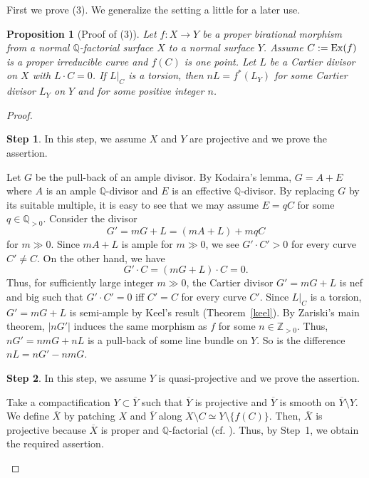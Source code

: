 \documentclass[12pt,twoside]{amsart}
\newtheorem{prop}[thm]{Proposition}
\theoremstyle{definition}
\newtheorem{step}{Step}
\newcommand{\Q}{$\mathbb{Q}$}
\begin{document}
First we prove (3). 
We generalize the setting a little for a later use. 

\begin{prop}[Proof of (3)]\label{(3)}
Let $f:X \to Y$ be a proper birational morphism 
from a normal \Q-factorial surface $X$ 
to a normal surface $Y$. 
Assume $C:={\rm Ex}(f)$ is a proper irreducible curve and $f(C)$ is one point. 
Let $L$ be a Cartier divisor on $X$ with $L\cdot C=0$. 
If $L|_C$ is a torsion, then $nL=f^*(L_Y)$ 
for some Cartier divisor $L_Y$ on $Y$ and for some positive integer $n$.
\end{prop}

\begin{proof}
\setcounter{step}{0}
\begin{step}
In this step, we assume $X$ and $Y$ are projective and 
we prove the assertion. 

Let $G$ be the pull-back of an ample divisor. 
By Kodaira's lemma, $G=A+E$ where $A$ is an ample \Q-divisor and 
$E$ is an effective \Q-divisor. 
By replacing $G$ by its suitable multiple, 
it is easy to see that we may assume $E=qC$ for some $q\in \mathbb Q_{>0}.$ 
Consider the divisor 
$$G'=mG+L=(mA+L)+mqC$$ 
for $m \gg 0.$ 
Since $mA+L$ is ample for $m\gg 0$, 
we see $G'\cdot C'>0$ for every curve $C'\neq C.$ 
On the other hand, we have 
$$G'\cdot C=(mG+L)\cdot C=0.$$
Thus, for sufficiently large integer $m\gg 0$, 
the Cartier divisor $G'=mG+L$ is nef and big such that 
$G'\cdot C'=0$ iff $C'=C$ for every curve $C'$. 
Since $L|_C$ is a torsion, 
$G'=mG+L$ is semi-ample by Keel's result (Theorem~\ref{keel}). 
By Zariski's main theorem, $|nG'|$ induces the 
same morphism as $f$ for some $n\in\mathbb Z_{>0}$. 
Thus, $nG'=nmG+nL$ is a pull-back of some line bundle on $Y$. 
So is the difference $nL=nG'-nmG$. 
\end{step}

\begin{step}
In this step, we assume $Y$ is quasi-projective and 
we prove the assertion. 

Take a compactification $Y\subset \overline Y$ such that 
$\overline Y$ is projective and $\overline Y$ is smooth on $\overline Y\setminus Y$. 
We define $\overline X$ by patching $X$ and $\overline Y$ along 
$X\setminus C\simeq Y\setminus \{f(C)\}.$ 
Then, $\overline X$ is projective because $\overline X$ is proper and \Q-factorial 
(cf. \cite[Lemma~2.2]{Fujino}). 
Thus, by Step~1, we obtain the required assertion. 
\end{step}


\end{proof}
\end{document}
